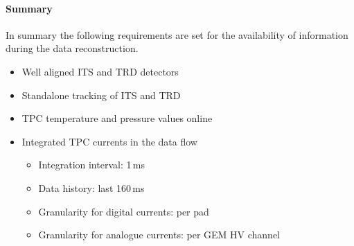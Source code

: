 \paragraph{Summary}
In summary the following requirements are set for the availability of
information during the data reconstruction.
\begin{itemize}
  \item Well aligned ITS and TRD detectors
  \item Standalone tracking of ITS and TRD
  \item TPC temperature and pressure values online
  \item Integrated TPC currents in the data flow
  \begin{itemize}
    \item Integration interval: 1\,ms
    \item Data history: last 160\,ms
    \item Granularity for digital currents: per pad
    \item Granularity for analogue currents: per GEM HV channel
  \end{itemize}

\end{itemize}




